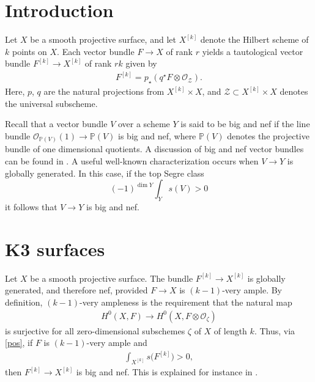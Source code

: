 \documentclass[11pt]{article}
\numberwithin{equation}{section}
\numberwithin{equation}{section}
\begin{document}
\section{Introduction}Let $X$ be a smooth projective surface, and let $X^{[k]}$ denote the Hilbert scheme of $k$ points on $X$. Each vector bundle $F\to X$ of rank $r$ yields a tautological vector bundle $F^{[k]}\to X^{[k]}$ of rank $rk$ given by \vspace{-.5ex}
\begin{gather*}
F^{[k]}=p_{\star} (q^{\star} F\otimes \mathcal O_{\mathcal Z}).
\end{gather*}
Here, $p$, $q$ are the natural projections from $X^{[k]}\times X$, and $\mathcal Z\subset X^{[k]}\times X$ denotes the universal subscheme.


Recall that a vector bundle $V$ over a scheme $Y$ is said to be big and nef if the line bundle $\mathcal O_{\mathbb P(V)}(1)\to \mathbb P(V)$ is big and nef, where $\mathbb P(V)$ denotes the projective bundle of one dimensional quotients. A discussion of big and nef vector bundles can be found in \cite[Chapters~6 and~7]{L-II}.
A useful well-known characterization occurs when $V\to Y$ is globally generated. In this case, if the top Segre class
\begin{equation}
\label{pos}(-1)^{\dim Y} \int_{Y} s(V)>0
\end{equation}
it follows that $V\to Y$ is big and nef.

\setcounter{section}{1}
\section[K3 surfaces]{$\boldsymbol{K3}$ surfaces} \label{seck3} Let $X$ be a smooth projective surface. The bundle $F^{[k]}\to X^{[k]}$ is globally generated, and therefore nef, provided $F\to X$ is $(k-1)$-very ample. By definition, $(k-1)$-very ampleness is the requirement that the natural map
\begin{gather*}
H^0(X, F)\to H^0(X, F\otimes \mathcal O_{\zeta})
\end{gather*}
is surjective for all zero-dimensional subschemes $\zeta$ of $X$ of length $k$. Thus, via \eqref{pos}, if $F$ is $(k-1)$-very ample and
\begin{gather*}
\int_{X^{[k]}} s\big(F^{[k]}\big)>0,
\end{gather*}
then $F^{[k]}\to X^{[k]}$ is big and nef. This is explained for instance in \cite[Propositions~2.4 and~4.5]{BBF}.
\end{document}

